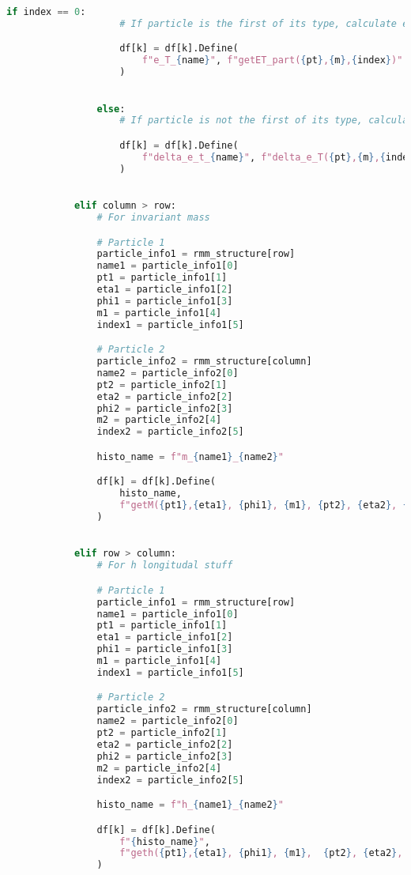 \begin{lstlisting}[language=Python, style=pythonstyle, label={code:RMM_implementation}]
                if index == 0:
                    # If particle is the first of its type, calculate e_T of particle

                    df[k] = df[k].Define(
                        f"e_T_{name}", f"getET_part({pt},{m},{index})"
                    )
                    

                else:
                    # If particle is not the first of its type, calculate the difference in e_T

                    df[k] = df[k].Define(
                        f"delta_e_t_{name}", f"delta_e_T({pt},{m},{index})"
                    )
                    

            elif column > row:
                # For invariant mass

                # Particle 1
                particle_info1 = rmm_structure[row]
                name1 = particle_info1[0]
                pt1 = particle_info1[1]
                eta1 = particle_info1[2]
                phi1 = particle_info1[3]
                m1 = particle_info1[4]
                index1 = particle_info1[5]

                # Particle 2
                particle_info2 = rmm_structure[column]
                name2 = particle_info2[0]
                pt2 = particle_info2[1]
                eta2 = particle_info2[2]
                phi2 = particle_info2[3]
                m2 = particle_info2[4]
                index2 = particle_info2[5]

                histo_name = f"m_{name1}_{name2}"

                df[k] = df[k].Define(
                    histo_name,
                    f"getM({pt1},{eta1}, {phi1}, {m1}, {pt2}, {eta2}, {phi2}, {m2}, {index1}, {index2})",
                )
               

            elif row > column:
                # For h longitudal stuff

                # Particle 1
                particle_info1 = rmm_structure[row]
                name1 = particle_info1[0]
                pt1 = particle_info1[1]
                eta1 = particle_info1[2]
                phi1 = particle_info1[3]
                m1 = particle_info1[4]
                index1 = particle_info1[5]

                # Particle 2
                particle_info2 = rmm_structure[column]
                name2 = particle_info2[0]
                pt2 = particle_info2[1]
                eta2 = particle_info2[2]
                phi2 = particle_info2[3]
                m2 = particle_info2[4]
                index2 = particle_info2[5]

                histo_name = f"h_{name1}_{name2}"

                df[k] = df[k].Define(
                    f"{histo_name}",
                    f"geth({pt1},{eta1}, {phi1}, {m1},  {pt2}, {eta2}, {phi2}, {m2},  {index1}, {index2})",
                )
                
\end{lstlisting}
